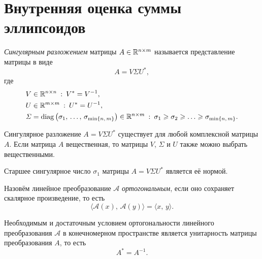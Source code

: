 \clearpage
\section{Внутренняя оценка суммы эллипсоидов}

\begin{definition}
        \textit{Сингулярным разложением} матрицы $A \in \mathbb{R}^{n \times m}$ называется представление матрицы в виде
$$
        A = V \mathit{\Sigma} U^*, 
$$
        где
$$
\begin{aligned}
&V \in \mathbb{R}^{n \times n}\::\: V^* = V^{-1},\\
&U \in \mathbb{R}^{m \times m}\::\: U^* = U^{-1},\\
&\mathit{\Sigma} = \mathrm{diag}\left(\sigma_1,\,\ldots,\,\sigma_{\min\{n,\,m\}}\right) \in \mathbb{R}^{n \times m}\::\:\sigma_1 \geqslant \sigma_2 \geqslant \ldots \geqslant \sigma_{\min\{n,\,m\}}.
\end{aligned}
$$ 
\end{definition}

\begin{theorem}
        Сингулярное разложение
        $A = V \mathit{\Sigma} U^*$
        существует для любой комплексной матрицы $A$.
        Если матрица $A$ вещественная, то матрицы $V$, $\mathit{\Sigma}$ и $U$ также можно выбрать вещественными. 
\end{theorem}

\begin{theorem}
        Старшее сингулярное число $\sigma_1$ матрицы $A = V \mathit{\Sigma} U^*$ является её нормой.
\end{theorem}

\begin{definition}
        Назовём линейное преобразование $\mathcal{A}$ \textit{ортогональным}, если оно сохраняет скалярное произведение, то есть
$$
        \langle \mathcal{A}(x),\,\mathcal{A}(y)\rangle = \langle x,\,y\rangle.
$$
\end{definition}

\begin{theorem}\label{th:unitarnost}
        Необходимым и достаточным условием ортогональности линейного преобразования $\mathcal{A}$ в конечномерном пространстве является унитарность матрицы преобразования $A$, то есть
$$
        A^* = A^{-1}.
$$
\end{theorem}

